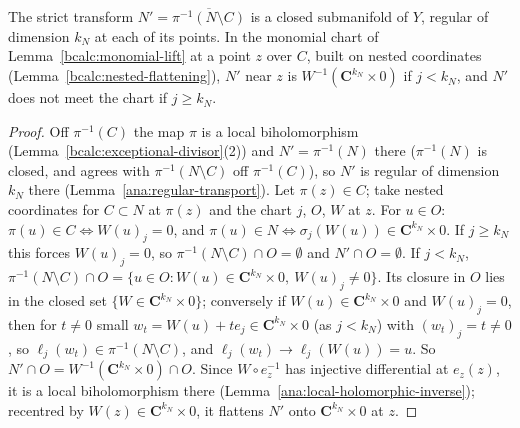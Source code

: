 \begin{theorem}
\label{bcalc:strict-submanifold}
\mixedleanok
The strict transform \(N'=\overline{\pi^{-1}(N\setminus C)}\) is a closed submanifold of \(Y\), regular of dimension \(k_N\) at each of
its points. In the monomial chart of Lemma~\ref{bcalc:monomial-lift} at a point \(z\) over \(C\), built on nested coordinates
(Lemma~\ref{bcalc:nested-flattening}), \(N'\) near \(z\) is \(W^{-1}(\mathbf C^{k_N}\times0)\) if \(j<k_N\), and \(N'\) does not meet the chart
if \(j\ge k_N\).
\end{theorem}
\begin{proof}
\mixedleanok
Off \(\pi^{-1}(C)\) the map \(\pi\) is a local biholomorphism (Lemma~\ref{bcalc:exceptional-divisor}(2)) and \(N'=\pi^{-1}(N)\) there
(\(\pi^{-1}(N)\) is closed, and agrees with \(\pi^{-1}(N\setminus C)\) off \(\pi^{-1}(C)\)), so \(N'\) is regular of dimension \(k_N\) there
(Lemma~\ref{ana:regular-transport}). Let \(\pi(z)\in C\); take nested coordinates for \(C\subset N\) at \(\pi(z)\) and the chart
\(j\), \(O\), \(W\) at \(z\). For \(u\in O\): \(\pi(u)\in C\iff W(u)_j=0\), and \(\pi(u)\in N\iff\sigma_j(W(u))\in\mathbf C^{k_N}\times0\). If
\(j\ge k_N\) this forces \(W(u)_j=0\), so \(\pi^{-1}(N\setminus C)\cap O=\emptyset\) and \(N'\cap O=\emptyset\). If \(j<k_N\),
\(\pi^{-1}(N\setminus C)\cap O=\{u\in O:W(u)\in\mathbf C^{k_N}\times0,\ W(u)_j\ne0\}\). Its closure in \(O\) lies in the closed set
\(\{W\in\mathbf C^{k_N}\times0\}\); conversely if \(W(u)\in\mathbf C^{k_N}\times0\) and \(W(u)_j=0\), then for \(t\ne0\) small
\(w_t=W(u)+te_j\in\mathbf C^{k_N}\times0\) (as \(j<k_N\)) with \((w_t)_j=t\ne0\), so \(\ell_j(w_t)\in\pi^{-1}(N\setminus C)\), and
\(\ell_j(w_t)\to\ell_j(W(u))=u\). So \(N'\cap O=W^{-1}(\mathbf C^{k_N}\times0)\cap O\). Since \(W\circ e_z^{-1}\) has injective differential at
\(e_z(z)\), it is a local biholomorphism there (Lemma~\ref{ana:local-holomorphic-inverse}); recentred by \(W(z)\in\mathbf C^{k_N}\times0\),
it flattens \(N'\) onto \(\mathbf C^{k_N}\times0\) at \(z\).
\end{proof}


